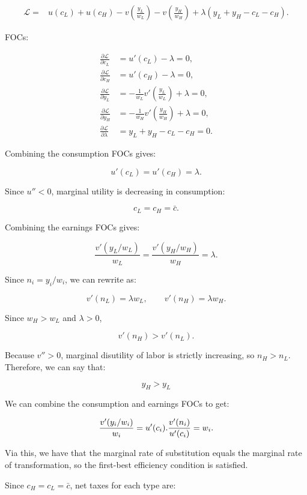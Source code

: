 \documentclass[
  letterpaper,
  DIV=11,
  numbers=noendperiod]{scrartcl}
\begin{document}
\[
\begin{aligned}
\mathcal{L}
= {} & u(c_L) + u(c_H)
- v\left(\frac{y_L}{w_L}\right)
- v\left(\frac{y_H}{w_H}\right) + \lambda(y_L+y_H-c_L-c_H).
\end{aligned}
\]

FOCs:

\[
\begin{aligned}
\frac{\partial\mathcal{L}}{\partial c_L}
&=u'(c_L)-\lambda=0,\\
\frac{\partial\mathcal{L}}{\partial c_H}
&=u'(c_H)-\lambda=0,\\
\frac{\partial\mathcal{L}}{\partial y_L}
&=-\frac{1}{w_L}v'\left(\frac{y_L}{w_L}\right)+\lambda=0,\\
\frac{\partial\mathcal{L}}{\partial y_H}
&=-\frac{1}{w_H}v'\left(\frac{y_H}{w_H}\right)+\lambda=0,\\
\frac{\partial\mathcal{L}}{\partial\lambda}
&=y_L+y_H-c_L-c_H=0.
\end{aligned}
\]

Combining the consumption FOCs gives:

\[
u'(c_L)=u'(c_H)=\lambda.
\]

Since \(u''<0\), marginal utility is decreasing in consumption:

\[
c_L=c_H=\bar{c}.
\]

Combining the earnings FOCs gives:

\[
\frac{v'(y_L/w_L)}{w_L}
=
\frac{v'(y_H/w_H)}{w_H}
=\lambda.
\]

Since \(n_i=y_i/w_i\), we can rewrite as:

\[
v'(n_L)=\lambda w_L,
\qquad
v'(n_H)=\lambda w_H.
\]

Since \(w_H>w_L\) and \(\lambda>0\),

\[
v'(n_H)>v'(n_L).
\]

Because \(v''>0\), marginal disutility of labor is strictly increasing,
so \(n_H>n_L\). Therefore, we can say that:

\[
y_H>y_L
\]

We can combine the consumption and earnings FOCs to get:

\[
\frac{v'(y_i/w_i)}{w_i}=u'(c_i).
\\\\
\frac{v'(n_i)}{u'(c_i)}=w_i.
\]

Via this, we have that the marginal rate of substitution equals the
marginal rate of transformation, so the first-best efficiency condition
is satisfied.

Since \(c_H=c_L=\bar{c}\), net taxes for each type are:
\end{document}
